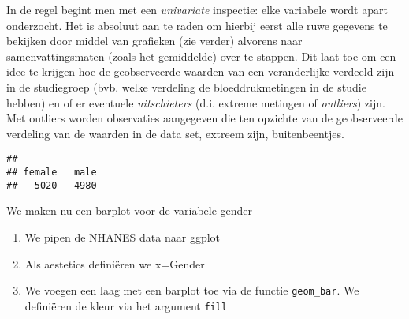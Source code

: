 \documentclass[
  12pt,dutch,coursenotes]{book}
\newenvironment{Shaded}{\begin{snugshade}}{\end{snugshade}}
\newcommand{\CommentTok}[1]{\textcolor[rgb]{0.56,0.35,0.01}{\textit{#1}}}
\newcommand{\KeywordTok}[1]{\textcolor[rgb]{0.13,0.29,0.53}{\textbf{#1}}}
\newcommand{\NormalTok}[1]{#1}
\newcommand{\OperatorTok}[1]{\textcolor[rgb]{0.81,0.36,0.00}{\textbf{#1}}}
\newcommand{\StringTok}[1]{\textcolor[rgb]{0.31,0.60,0.02}{#1}}
\providecommand{\tightlist}{%
  \setlength{\itemsep}{0pt}\setlength{\parskip}{0pt}}
\theoremstyle{definition}
\theoremstyle{definition}
\theoremstyle{definition}
\theoremstyle{remark}
\begin{document}
In de regel begint men met een \emph{univariate} inspectie: elke variabele
wordt apart onderzocht. Het is absoluut aan te raden om hierbij eerst alle
ruwe gegevens te bekijken door middel van grafieken (zie verder) alvorens
naar samenvattingsmaten (zoals het gemiddelde) over te stappen. Dit laat toe
om een idee te krijgen hoe de geobserveerde waarden van een veranderlijke
verdeeld zijn in de studiegroep (bvb. welke verdeling de bloeddrukmetingen in de studie hebben)
en of er eventuele \emph{uitschieters} (d.i. extreme
metingen of \emph{outliers}) zijn. Met outliers worden observaties
aangegeven die ten opzichte van de geobserveerde verdeling van de waarden in
de data set, extreem zijn, buitenbeentjes.

\begin{Shaded}
\end{Shaded}

\begin{verbatim}
## 
## female   male 
##   5020   4980
\end{verbatim}

We maken nu een barplot voor de variabele gender

\begin{enumerate}
\def\labelenumi{\arabic{enumi}.}
\tightlist
\item
  We pipen de NHANES data naar ggplot
\item
  Als aestetics definiëren we x=Gender
\item
  We voegen een laag met een barplot toe via de functie \texttt{geom\_bar}. We definiëren de kleur via het argument \texttt{fill}
\end{enumerate}
\end{document}
